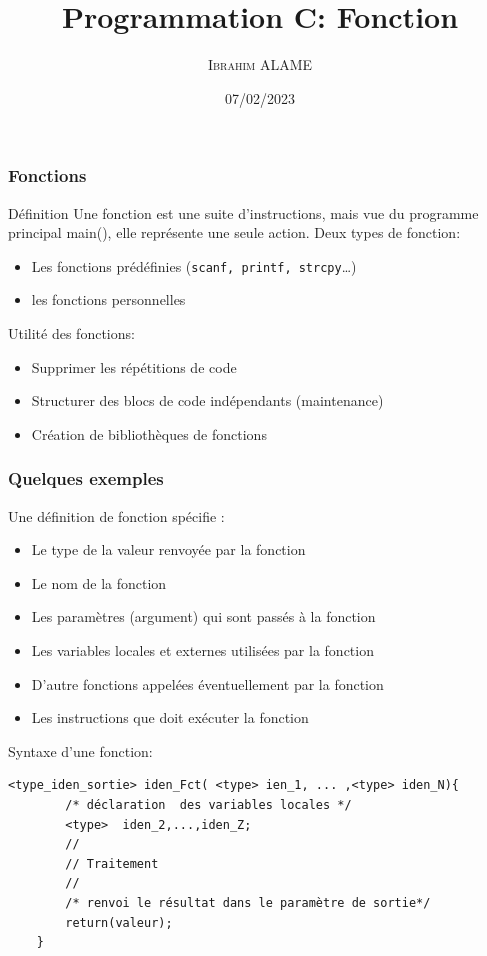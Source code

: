 \documentclass{beamer}
\title{Programmation C: Fonction}
\author{ \textsc{Ibrahim ALAME}}\institute{ESIEE}
\date{07/02/2023}
\begin{document}
\maketitle
 \begin{frame}
  \frametitle{Fonctions}
  \begin{block}{Définition}
 Une fonction est une suite d'instructions, mais vue du programme principal main(), elle représente une seule action.
Deux types de fonction:
\begin{itemize}
\item Les fonctions prédéfinies ({\tt scanf, printf, strcpy}…)
\item les fonctions personnelles
\end{itemize}
\end{block}

Utilité des fonctions:
\begin{itemize}
\item Supprimer les répétitions de code
\item Structurer des blocs de code indépendants (maintenance)
\item Création de bibliothèques de fonctions
\end{itemize}

  \end{frame}
  
\begin{frame}[fragile]
\frametitle{Quelques exemples}
Une définition de fonction spécifie :
\begin{itemize}
\item Le type de la valeur renvoyée par la fonction
\item Le nom de la fonction
\item Les paramètres (argument) qui sont passés à la fonction
\item Les variables locales et externes utilisées par la fonction
\item D'autre fonctions appelées éventuellement par la fonction
\item Les instructions que doit exécuter la fonction
\end{itemize}

Syntaxe d'une fonction:

\begin{verbatim}
<type_iden_sortie> iden_Fct( <type> ien_1, ... ,<type> iden_N){
        /* déclaration  des variables locales */
        <type>  iden_2,...,iden_Z;
        //
        // Traitement 
        //
        /* renvoi le résultat dans le paramètre de sortie*/
        return(valeur);
    }

\end{verbatim}

\end{frame}
  
\end{document}
